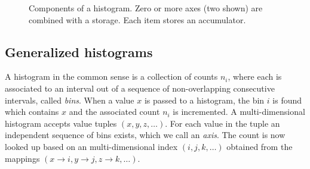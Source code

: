 \documentclass{webofc}
\begin{document}
\begin{figure}[h]
\begin{center}
		\caption{Components of a histogram. Zero or more axes (two shown) are combined with a storage. Each item stores an accumulator.}
		\label{fig-design}
	\end{center}
	
\end{figure}

\subsection{Generalized histograms}
\label{sec-bh-cpp-gen}

A histogram in the common sense is a collection of counts $n_i$, where each is associated to an interval out of a sequence of non-overlapping consecutive intervals, called \emph{bins}. When a value $x$ is passed to a histogram, the bin $i$ is found which contains $x$ and the associated count $n_i$ is incremented. A multi-dimensional histogram accepts value tuples $(x, y, z, \dots)$. For each value in the tuple an independent sequence of bins exists, which we call an \emph{axis}. The count is now looked up based on an multi-dimensional index $(i,j,k,\dots)$ obtained from the mappings $(x \rightarrow i, y \rightarrow j, z \rightarrow k, \dots)$.
\end{document}
